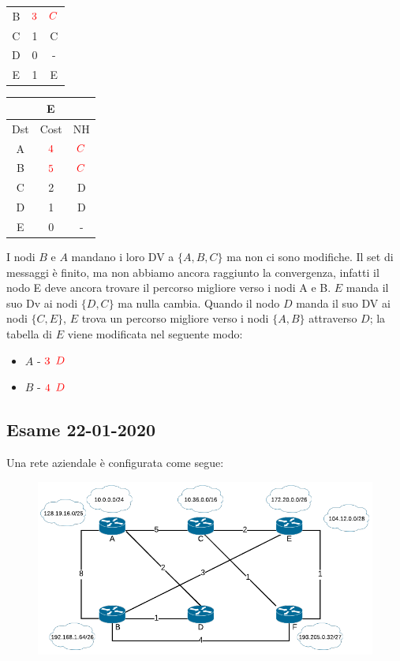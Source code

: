 \documentclass[10pt]{article}
\begin{document}
\begin{table}[h!]
\begin{tabular}{|c||c||c|}
					B & $\color{red} 3$ & $\color{red} C$ \\
					C & 1 & C \\
					D & 0 & - \\
					E & 1 & E \\
					\hline
				\end{tabular}
				\begin{tabular}{|c||c||c|}
					\hline
					\multicolumn{3}{|c|}{E} \\
					\hline
					Dst & Cost & NH \\
					\hline
					A & $\color{red} 4$ & $\color{red} C$ \\
					B & $\color{red} 5$ & $\color{red} C$ \\
					C & 2 & D \\
					D & 1 & D \\
					E & 0 & - \\
					\hline
				\end{tabular}
			\end{table}
			\newline \newline
			I nodi $B$ e $A$ mandano i loro DV a $\{A,B,C\}$ ma non ci sono modifiche. Il set di messaggi è finito, ma non abbiamo ancora raggiunto la convergenza, infatti il nodo E deve ancora trovare il percorso migliore verso i nodi A e B.
			\newline \newline $E$ manda il suo Dv ai nodi $\{D,C\}$ ma nulla cambia.
			\newline Quando il nodo $D$ manda il suo DV ai nodi $\{C,E\}$, $E$ trova un percorso migliore verso i nodi $\{A,B\}$ attraverso $D$; la tabella di $E$ viene modificata nel seguente modo:
			\begin{itemize}
				\item $A$ - $\color{red} 3$ $\color{red} D$
				\item $B$ - $\color{red} 4$ $\color{red} D$
			\end{itemize}

		\subsection{Esame 22-01-2020}
			Una rete aziendale è configurata come segue:
			\begin{figure}[h]
				\centering
				\includegraphics[width=13cm]{Esame 11-01-2019}
			\end{figure}
			
\end{document}

